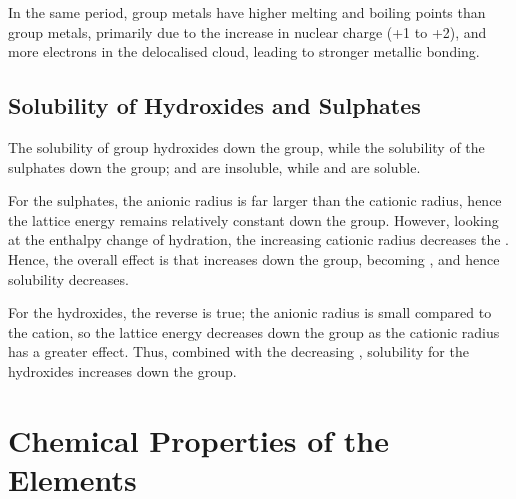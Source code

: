 				In the same period, group \rtwo{} metals have higher melting and boiling points than group  metals, primarily
				due to the increase in nuclear charge (+1 to +2), and more electrons in the delocalised cloud, leading to stronger metallic
				bonding.





		\subsection{Solubility of Hydroxides and Sulphates}

			The solubility of group \rtwo{} hydroxides  down the group, while the solubility of the sulphates 
			down the group;  and  are insoluble, while  and  are soluble.




			For the sulphates, the anionic radius is far larger than the cationic radius, hence the lattice energy remains relatively constant
			down the group. However, looking at the enthalpy change of hydration, the increasing cationic radius decreases the .
			Hence, the overall effect is that  increases down the group, becoming , and hence solubility decreases.

			For the hydroxides, the reverse is true; the anionic radius is small compared to the cation, so the lattice energy decreases
			down the group as the cationic radius has a greater effect. Thus, combined with the decreasing , solubility for
			the hydroxides increases down the group.



	\pagebreak
	\section{Chemical Properties of the Elements}

